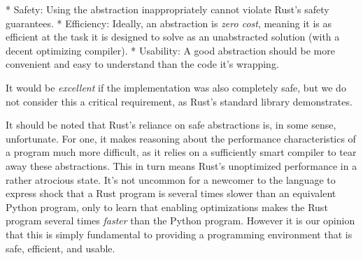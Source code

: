 * Safety: Using the abstraction inappropriately cannot violate Rust's safety guarantees.
* Efficiency: Ideally, an abstraction is \emph{zero cost}, meaning it is as efficient
  at the task it is designed to solve as an unabstracted solution (with a decent
  optimizing compiler).
* Usability: A good abstraction should be more convenient and easy to understand than
  the code it's wrapping.

It would be \emph{excellent} if the implementation was also completely safe, but we
do not consider this a critical requirement, as Rust's standard library demonstrates.

It should be noted that Rust's reliance on safe abstractions is, in some sense,
unfortunate. For one, it makes reasoning about the performance characteristics
of a program much more difficult, as it relies on a sufficiently
smart compiler to tear away these abstractions. This in turn means Rust's unoptimized
performance in a rather atrocious state. It's not uncommon for a newcomer to
the language to express shock that a Rust program is several times slower than
an equivalent Python program, only to learn that enabling optimizations makes
the Rust program several times \emph{faster} than the Python program.
However it is our opinion that this is simply fundamental to providing a
programming environment that is safe, efficient, and usable.


